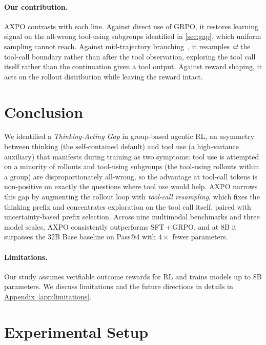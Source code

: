 \documentclass{llmxive}
\providecommand{\appref}[1]{\hyperref[#1]{Appendix~\ref*{#1}}}
\providecommand{\toolresample}{tool-call resampling\xspace}
\begin{document}
\paragraph{Our contribution.}
AXPO contrasts with each line. Against direct use of GRPO, it restores learning signal on the all-wrong tool-using subgroups identified in \autoref{sec:gap}, which uniform sampling cannot reach. Against mid-trajectory branching~\citep{arpo, aepo}, it resamples \emph{at} the tool-call boundary rather than after the tool observation, exploring the tool call itself rather than the continuation given a tool output. Against reward shaping, it acts on the rollout distribution while leaving the reward intact.

\section{Conclusion}
\label{sec:conclusion}

We identified a \emph{Thinking-Acting Gap} in group-based agentic RL, an asymmetry between thinking (the self-contained default) and tool use (a high-variance auxiliary) that manifests during training as two symptoms: tool use is attempted on a minority of rollouts and tool-using subgroups (the tool-using rollouts within a group) are disproportionately all-wrong, so the advantage at tool-call tokens is non-positive on exactly the questions where tool use would help. AXPO narrows this gap by augmenting the rollout loop with \emph{\toolresample}, which fixes the thinking prefix and concentrates exploration on the tool call itself, paired with uncertainty-based prefix selection. Across nine multimodal benchmarks and three model scales, AXPO consistently outperforms SFT\,+\,GRPO, and at 8B it surpasses the 32B Base baseline on Pass@4 with $4\times$ fewer parameters.

\paragraph{Limitations.}
Our study assumes verifiable outcome rewards for RL and trains models up to 8B parameters.
We discuss limitations and the future directions in details in \appref{app:limitations}.






\appendix

\section{Experimental Setup}
\label{app:setup}
\end{document}
